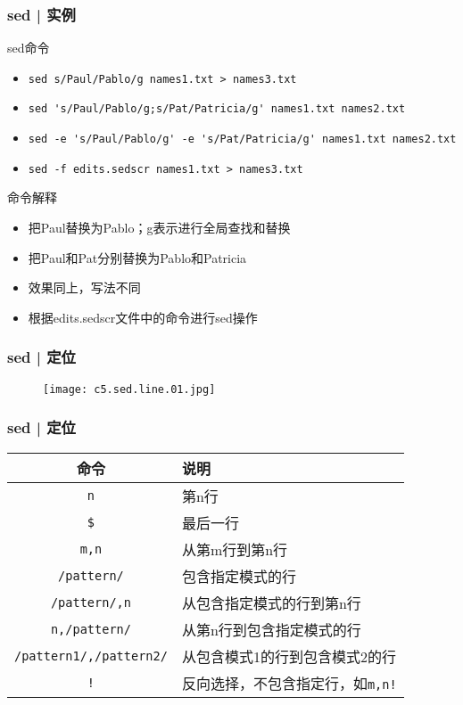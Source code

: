 \begin{frame}[fragile]
  \frametitle{sed | \alert{实例}}
  \begin{block}{sed命令}
    \begin{itemize}
      \item<2-> \verb|sed s/Paul/Pablo/g names1.txt > names3.txt|
      \item<4-> \verb|sed 's/Paul/Pablo/g;s/Pat/Patricia/g' names1.txt names2.txt|
      \item<6-> \verb|sed -e 's/Paul/Pablo/g' -e 's/Pat/Patricia/g' names1.txt names2.txt|
      \item<8-> \verb|sed -f edits.sedscr names1.txt > names3.txt|
    \end{itemize}
  \end{block}
  \begin{block}{命令解释}
    \begin{itemize}
      \item<3-> 把Paul替换为Pablo；g表示进行全局查找和替换
      \item<5-> 把Paul和Pat分别替换为Pablo和Patricia
      \item<7-> 效果同上，写法不同
      \item<9-> 根据edits.sedscr文件中的命令进行sed操作
    \end{itemize}
  \end{block}
\end{frame}

\begin{frame}
  \frametitle{sed | 定位}
  \begin{figure}
    \centering
    \texttt{[image: c5.sed.line.01.jpg]}
  \end{figure}
\end{frame}

\begin{frame}[fragile]
  \frametitle{sed | \alert{定位}}
  \begin{table}
    \centering
    \begin{tabularx}{\textwidth}{cX}
      \hline
      \rowcolor{blue!50}命令 & 说明\\
      \hline
      \verb|n| & 第n行\\
      \verb|$| & 最后一行\\
      \verb|m,n| & 从第m行到第n行\\
      \verb|/pattern/| & 包含指定模式的行\\
      \verb|/pattern/,n| & 从包含指定模式的行到第n行\\
      \verb|n,/pattern/| & 从第n行到包含指定模式的行\\
      \verb|/pattern1/,/pattern2/| & 从包含模式1的行到包含模式2的行\\
      \verb|!| & 反向选择，不包含指定行，如\verb|m,n!|\\
      \hline
    \end{tabularx}
  \end{table}
\end{frame}


